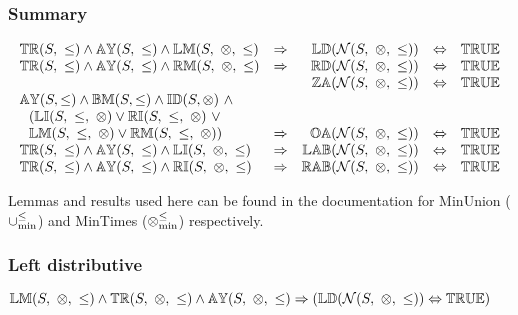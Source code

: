 \documentclass[../Summary.tex]{subfiles}
\begin{document}
\subsubsection{Summary}

\[
\begin{array}{lcrcl} 
\propname{TR}(S,\ \leq) \wedge \propname{AY}(S,\ \leq) \wedge \propname{LM}(S,\ \otimes,\ \leq)
	& \Rightarrow
	& \propname{LD}(\mathcal{N}(S,\ \otimes,\ \leq)) 
    & \Leftrightarrow 
    & \propname{TRUE}
    \\ 
\propname{TR}(S,\ \leq) \wedge \propname{AY}(S,\ \leq) \wedge \propname{RM}(S,\ \otimes,\ \leq)
	& \Rightarrow
	& \propname{RD}(\mathcal{N}(S,\ \otimes,\ \leq)) 
    & \Leftrightarrow 
    & \propname{TRUE}
    \\ 
& & \propname{ZA}(\mathcal{N}(S,\ \otimes,\ \leq)) 
    & \Leftrightarrow 
    & \propname{TRUE}
    \\ 
\propname{AY}(S,\leq) \wedge \propname{BM}(S,\leq) \wedge \propname{ID}(S,\otimes) \ \wedge \\
\ \ (\propname{LI}(S,\ \leq,\ \otimes) \vee \propname{RI}(S,\ \leq,\ \otimes) \ \vee \\
\ \ \propname{LM}(S,\ \leq,\ \otimes) \vee \propname{RM}(S,\ \leq,\ \otimes))
	& \Rightarrow 
	& \propname{OA}(\mathcal{N}(S,\ \otimes,\ \leq)) 
    & \Leftrightarrow 
    & \propname{TRUE}
    \\ 
\propname{TR}(S,\ \leq) \wedge \propname{AY}(S,\ \leq) \wedge \propname{LI}(S,\ \otimes,\ \leq) 
	& \Rightarrow 
	& \propname{LAB}(\mathcal{N}(S,\ \otimes,\ \leq)) 
    & \Leftrightarrow 
    & \propname{TRUE}
    \\ 
\propname{TR}(S,\ \leq) \wedge \propname{AY}(S,\ \leq) \wedge \propname{RI}(S,\ \otimes,\ \leq) 
	& \Rightarrow 
	& \propname{RAB}(\mathcal{N}(S,\ \otimes,\ \leq)) 
    & \Leftrightarrow 
    & \propname{TRUE}
    \\
\end{array} 
\] 

Lemmas and results used here can be found in the documentation for MinUnion ($\mathbin{\cup_{\min}^{\leq}}$) and MinTimes ($\mathbin{\otimes_{\min}^{\leq}}$) respectively.



\subsubsection{Left distributive}

$\propname{LM}(S,\ \otimes,\ \leq) \wedge \propname{TR}(S,\ \otimes,\ \leq) \wedge \propname{AY}(S,\ \otimes, \ \leq) \Rightarrow (\propname{LD}(\mathcal{N}(S,\ \otimes,\ \leq))  \Leftrightarrow \propname{TRUE})$
\end{document}
